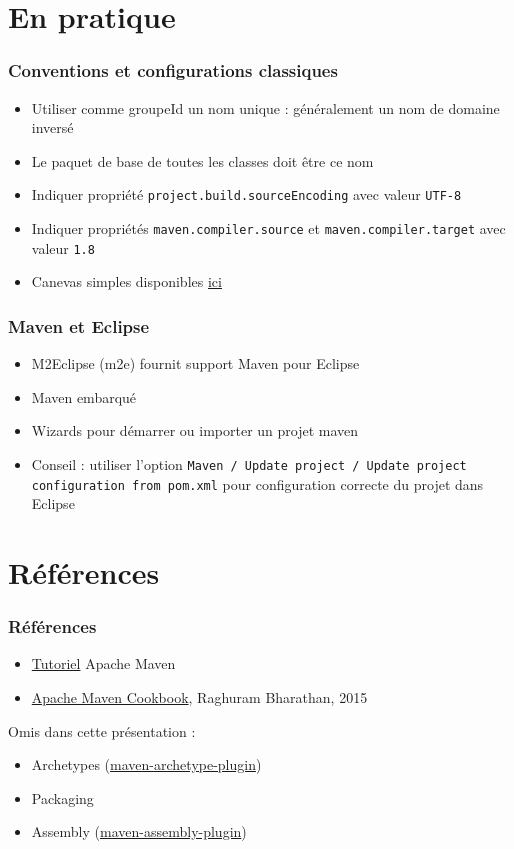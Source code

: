\documentclass[english, french]{beamer}
\begin{document}
\section{En pratique}
\begin{frame}
	\frametitle{Conventions et configurations classiques}
	\begin{itemize}
		\item Utiliser comme groupeId un nom unique : généralement un nom de domaine inversé
		\item Le paquet de base de toutes les classes doit être ce nom
		\item Indiquer propriété \texttt{project.build.sourceEncoding} avec valeur \texttt{UTF-8}
		\item Indiquer propriétés \texttt{maven.compiler.source} et \texttt{maven.compiler.target} avec valeur \texttt{1.8}
		\item Canevas simples disponibles \href{https://github.com/oliviercailloux/samples}{ici}
	\end{itemize}
\end{frame}

\begin{frame}
	\frametitle{Maven et Eclipse}
	\begin{itemize}
		\item M2Eclipse (m2e) fournit support Maven pour Eclipse
		\item Maven embarqué
		\item Wizards pour démarrer ou importer un projet maven
		\item Conseil : utiliser l’option \texttt{Maven / Update project / Update project configuration from pom.xml} pour configuration correcte du projet dans Eclipse
	\end{itemize}
\end{frame}

\section{Références}
\begin{frame}
	\frametitle{Références}
	\begin{itemize}
		\item \href{https://maven.apache.org/guides/getting-started/index.html}{Tutoriel} Apache Maven
		\item \href{http://gen.lib.rus.ec/book/index.php?md5=6e0bc8159b52299fdb912e3726c43bd9}{Apache Maven Cookbook}, Raghuram Bharathan, 2015
	\end{itemize}
	Omis dans cette présentation :
	\begin{itemize}
		\item Archetypes (\href{http://maven.apache.org/archetype/maven-archetype-plugin/usage.html}{maven-archetype-plugin})
		\item Packaging
		\item Assembly (\href{http://maven.apache.org/plugins/maven-assembly-plugin/}{maven-assembly-plugin})
	\end{itemize}
\end{frame}
\end{document}
